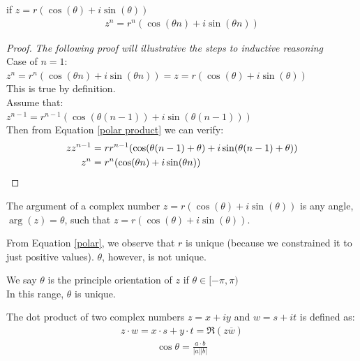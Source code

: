 \begin{theorem}
    if $z = r(\cos(\theta) + i\sin(\theta))$
    \begin{align}
        z^n = r^n(\cos(\theta n) + i\sin(\theta n)) \label{Moivre}
    \end{align}
\end{theorem}

\begin{proof}
    \textit{The following proof will illustrative the steps to inductive reasoning}\\
    Case of $n = 1$: $z^n = r^n(\cos(\theta n) + i\sin(\theta n)) = z = r(\cos(\theta) + i\sin(\theta))$ \\
    This is true by definition. \\
    Assume that: \\
    $z^{n-1} = r^{n-1}(\cos(\theta (n-1)) + i\sin(\theta (n-1)))$ \\
    Then from Equation \eqref{polar product} we can verify: \\
    \begin{align}
        zz^{n-1} & = rr^{n-1}(\cos(\theta (n-1) + \theta) + i\sin(\theta (n-1) + \theta)) \notag \\
        z^{n}    & = r^{n}(\cos(\theta n) + i\sin(\theta n)) \notag
    \end{align}
\end{proof}

\begin{definition}
    [Argument]
    The argument of a complex number $z = r(\cos(\theta) + i\sin(\theta))$ is any angle, $\arg(z) = \theta$, such that $z = r(\cos(\theta) + i\sin(\theta))$.
\end{definition}

From Equation \eqref{polar}, we observe that $r$ is unique (because we constrained it to just positive values). $\theta$, however, is not unique.

\begin{definition}
    We say $\theta$ is the principle orientation of $z$ if $\theta \in [-\pi, \pi)$ \\
    In this range, $\theta$ is unique.
\end{definition}

\begin{definition}
     The dot product of two complex numbers $z = x+ iy$ and $w = s + it$ is defined as:
    \begin{align}
        z \cdot w = x \cdot s + y \cdot t = \Re(z\overline{w})
        \label{dot product}
    \end{align}
    \begin{align}
        \cos \theta = \frac{a \cdot b}{|a||b|}
    \end{align}
\end{definition}

